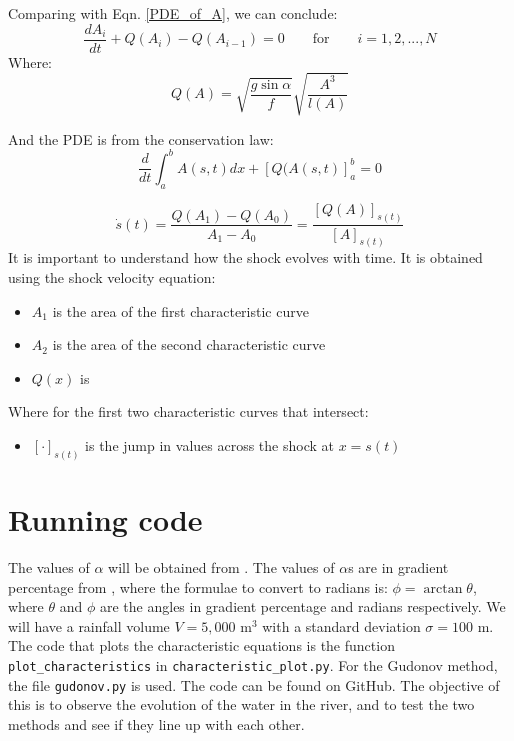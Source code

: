 \documentclass[12pt]{article}
\begin{document}
Comparing with Eqn. \ref{PDE_of_A}, we can conclude:
\begin{equation}
    \frac{dA_i}{dt} + Q(A_i) - Q(A_{i-1}) = 0 \qquad \text{for} \qquad i = 1, 2, ..., N
\end{equation}
Where:
\begin{equation}
    Q(A) = \sqrt{\frac{g\sin\alpha}{f}}\sqrt{\frac{A^3}{l(A)}}
\end{equation}

And the PDE is from the conservation law:
\begin{equation}
    \frac{d}{dt}\int_a^b A(s, t)dx + [Q(A(s, t)]_a^b = 0
    \label{eqn:conservation_law_oint}
\end{equation}

\begin{equation}
    \dot s(t) = \frac{Q(A_1)- Q(A_0)}{A_1 - A_0} = \frac{[Q(A)]_{s(t)}}{[A]_{s(t)}}
\end{equation}
It is important to understand how the shock evolves with time. It is obtained using the shock velocity equation:
\begin{itemize}
    \item $A_1$ is the area of the first characteristic curve
    \item $A_2$ is the area of the second characteristic curve
    \item $Q(x)$ is 
\end{itemize}
Where for the first two characteristic curves that intersect:
\begin{itemize}
    \item $[\cdot]_{s(t)}$ is the jump in values across the shock at $x = s(t)$
\end{itemize}

\section{Running code}
\label{sec:results}
The values of $\alpha$ will be obtained from \cite{ROSGEN1994169}. The values of $\alpha$s are in gradient percentage from \cite{ROSGEN1994169}, where the formulae to convert to radians is: $\phi = \arctan{\theta}$, where $\theta$ and $\phi$ are the angles in gradient percentage and radians respectively. We will have a rainfall volume $V = 5,000\text{ m}^3$ \cite{} with a standard deviation $\sigma = 100\text{ m}$. The code that plots the characteristic equations is the function \verb|plot_characteristics| in \verb|characteristic_plot.py|. For the Gudonov method, the file \verb|gudonov.py| is used. The code can be found on GitHub\cite{linsuong_2023}. The objective of this is to observe the evolution of the water in the river, and to test the two methods and see if they line up with each other.
\end{document}
